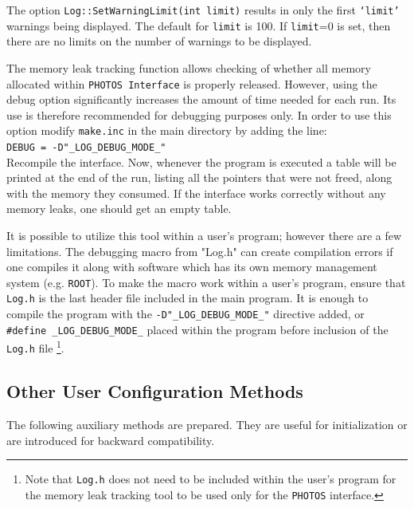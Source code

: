\documentclass[]{Photos_interface_design}
\begin{document}
The option {\tt Log::SetWarningLimit(int limit)} results in 
only the first {\tt `limit'} warnings being displayed. The default for {\tt limit} is 100. 
If {\tt limit}=0 is set, then there are no limits on the number of warnings to be displayed.

The memory leak tracking function allows checking of whether all memory allocated within {\tt PHOTOS Interface}
 is properly released. However, using the debug option significantly increases the amount of time needed for 
each run. Its  use is therefore recommended  for debugging purposes only. In order to use this option
 modify {\tt make.inc} in the main directory by adding the line: \\ 
 {\tt DEBUG = -D"\_LOG\_DEBUG\_MODE\_" } \\ 
Recompile the interface.
Now, whenever the program is executed a table will be printed at the end of the run,
listing all the pointers that were not freed, along with the memory they consumed.
If the interface works correctly without any memory leaks, one should get an empty table.

It is possible to utilize this tool within a user's program; however there are a few limitations.
The debugging macro from "Log.h" can create compilation errors if one compiles
it along with software which has its own memory management system (e.g. {\tt ROOT}).
To make the macro work within a user's program, ensure that {\tt Log.h} is the last header file
included in the main program.
It is enough to  compile the program with the {\tt -D"\_LOG\_DEBUG\_MODE\_"} directive added,
or {\tt \#define \_LOG\_DEBUG\_MODE\_} placed within the program before inclusion of
 the {\tt Log.h} file%
\footnote{Note that {\tt Log.h} does not need to be included within
the user's program  for the memory leak tracking tool to be used only for the {\tt PHOTOS} interface.
}.

\subsection{Other User Configuration Methods}
\label{subsection:other_methods}

The following auxiliary methods are prepared. They are useful for initialization 
or are introduced for backward compatibility.
\end{document}

